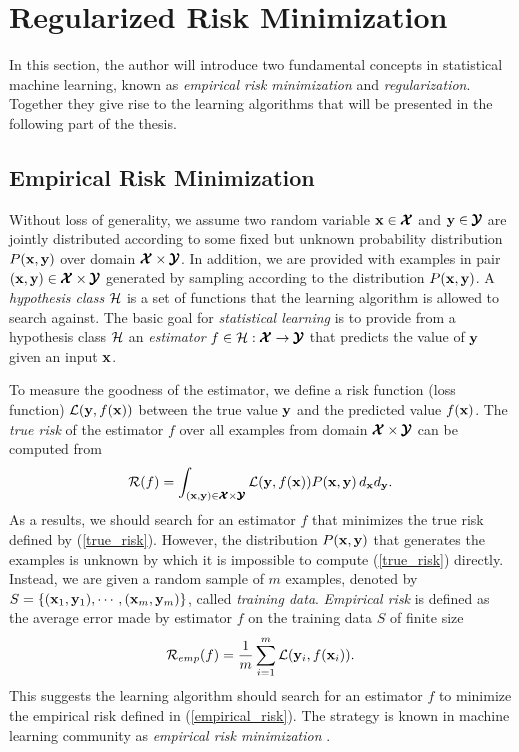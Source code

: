 %
\section{Regularized Risk Minimization}\label{sc_rrm}

In this section, the author will introduce two fundamental concepts in statistical machine learning, known as \textit{empirical risk minimization} and \textit{regularization}.
Together they give rise to the learning algorithms that will be presented in the following part of the thesis.

\subsection{Empirical Risk Minimization}\label{sc_erm}

Without loss of generality, we assume two random variable $\mathbf {x}\in\pmb {\mathcal{X}}$ and $\mathbf {y}\in\pmb {\mathcal{Y}}$ are jointly distributed according to some fixed but unknown probability distribution $P(\mathbf {x},\mathbf {y})$ over domain $\pmb {\mathcal{X}}\times\pmb {\mathcal{Y}}$.
In addition, we are provided with examples in pair $(\mathbf {x},\mathbf {y})\in\pmb {\mathcal{X}}\times\pmb {\mathcal{Y}}$ generated by sampling according to the distribution $P(\mathbf {x},\mathbf {y})$.
A \textit{hypothesis class} $\mathcal{H}$ is a set of functions that the learning algorithm is allowed to search against.
The basic goal for \textit{statistical learning} is to provide from a hypothesis class $\mathcal{H}$ an \textit{estimator} $f\in\mathcal{H}:\pmb {\mathcal{X}}\rightarrow\pmb {\mathcal{Y}}$ that predicts the value of $\mathbf {y}$ given an input $\mathbf {x}$.

To measure the goodness of the estimator, we define a risk function (loss function) $\mathcal{L}(\mathbf {y},f(\mathbf {x}))$ between the true value $\mathbf {y}$ and the predicted value $f(\mathbf {x})$.
The \textit{true risk} of the estimator $f$ over all examples from domain $\pmb {\mathcal{X}}\times\pmb {\mathcal{Y}}$ can be computed from
\begin{align}
	\mathcal{R}(f) = \int_{(\mathbf {x},\mathbf {y})\in\pmb {\mathcal{X}}\times\pmb {\mathcal{Y}}}\mathcal{L}(\mathbf {y},f(\mathbf {x}))P(\mathbf {x},\mathbf {y})\,d_{\mathbf {x}}d_{\mathbf {y}} \label{true_risk}.
\end{align}
As a results, we should search for an estimator $f$ that minimizes the true risk defined by (\ref{true_risk}).
However, the distribution $P(\mathbf {x},\mathbf {y})$ that generates the examples is unknown by which it is impossible to compute (\ref{true_risk}) directly.
Instead, we are given a random sample of $m$ examples, denoted by $S=\{(\mathbf {x}_1,\mathbf {y}_1),\cdots,(\mathbf {x}_m,\mathbf {y}_m)\}$, called \textit{training data}.
\textit{Empirical risk} is defined as the average error made by estimator $f$ on the training data $S$ of finite size
\begin{align}
	\mathcal{R}_{emp}(f) = \frac{1}{m}\sum_{i=1}^{m}\mathcal{L}(\mathbf {y}_i,f(\mathbf {x}_i)) \label{empirical_risk}.
\end{align}
This suggests the learning algorithm should search for an estimator $f$ to minimize the empirical risk defined in (\ref{empirical_risk}).
The strategy is known in machine learning community as \textit{empirical risk minimization} \citep{Vapnik92principles}.

